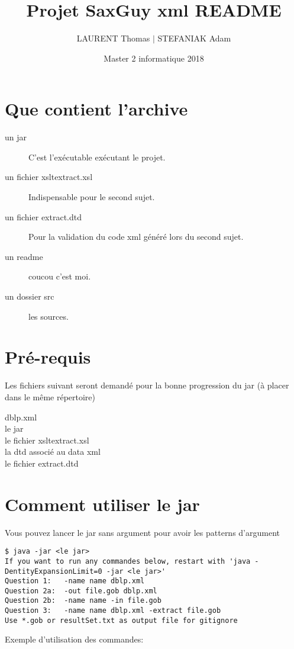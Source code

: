 \documentclass[french, 12pt]{report}
\title{Projet SaxGuy xml README}
\author{LAURENT Thomas $|$ STEFANIAK Adam}
\date{Master 2 informatique 2018}
\begin{document}
\maketitle
\pagebreak

\begin{titlepage}
\end{titlepage}
\pagebreak

\section{Que contient l'archive}
\begin{description}
\item[un jar] C'est l'exécutable exécutant le projet.
\item[un fichier xsltextract.xsl] Indispensable pour le second sujet.
\item[un fichier extract.dtd] Pour la validation du code xml généré lors du second sujet.
\item[un readme] coucou c'est moi.
\item[un dossier src] les sources. 
\end{description}

\section{Pré-requis}
Les fichiers suivant seront demandé pour la bonne progression du jar (à placer dans le même répertoire)
\begin{description}
\item[dblp.xml]
\item[le jar]
\item[le fichier xsltextract.xsl]
\item[la dtd associé au data xml]
\item[le fichier extract.dtd]
\end{description}

\section{Comment utiliser le jar}
Vous pouvez lancer le jar sans argument pour avoir les patterns d'argument

\lstset{style=mlpythoncode}
\begin{lstlisting}[]
$ java -jar <le jar>
If you want to run any commandes below, restart with 'java -DentityExpansionLimit=0 -jar <le jar>'
Question 1:   -name name dblp.xml
Question 2a:  -out file.gob dblp.xml
Question 2b:  -name name -in file.gob
Question 3:   -name name dblp.xml -extract file.gob
Use *.gob or resultSet.txt as output file for gitignore
\end{lstlisting}
\pagebreak
Exemple d'utilisation des commandes:
\end{document}
